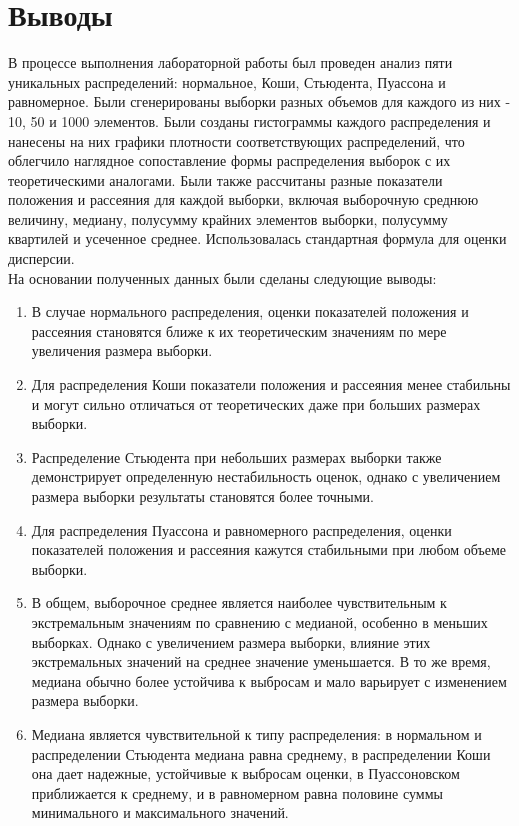 \documentclass[12pt,a4paper]{article}
\begin{document}
	\newpage

	\section{Выводы}

	В процессе выполнения лабораторной работы был проведен анализ пяти уникальных распределений: нормальное, Коши, Стьюдента, Пуассона и равномерное.
	Были сгенерированы выборки разных объемов для каждого из них - 10, 50 и 1000 элементов.
	Были созданы гистограммы каждого распределения и нанесены на них графики плотности соответствующих распределений, что облегчило наглядное сопоставление формы распределения выборок с их теоретическими аналогами.
	Были также рассчитаны разные показатели положения и рассеяния для каждой выборки, включая выборочную среднюю величину, медиану, полусумму крайних элементов выборки, полусумму квартилей и усеченное среднее.
	Использовалась стандартная формула для оценки дисперсии. \\

	На основании полученных данных были сделаны следующие выводы:

	\begin{enumerate}
		\item В случае нормального распределения, оценки показателей положения и рассеяния становятся ближе к их теоретическим значениям по мере увеличения размера выборки.
		\item Для распределения Коши показатели положения и рассеяния менее стабильны и могут сильно отличаться от теоретических даже при больших размерах выборки.
		\item Распределение Стьюдента при небольших размерах выборки также демонстрирует определенную нестабильность оценок, однако с увеличением размера выборки результаты становятся более точными.
		\item Для распределения Пуассона и равномерного распределения, оценки показателей положения и рассеяния кажутся стабильными при любом объеме выборки.
		\item В общем, выборочное среднее является наиболее чувствительным к экстремальным значениям по сравнению с медианой, особенно в меньших выборках. Однако с увеличением размера выборки, влияние этих экстремальных значений на среднее значение уменьшается. В то же время, медиана обычно более устойчива к выбросам и мало варьирует с изменением размера выборки.
		\item Медиана является чувствительной к типу распределения: в нормальном и распределении Стьюдента медиана равна среднему, в распределении Коши она дает надежные, устойчивые к выбросам оценки, в Пуассоновском приближается к среднему, и в равномерном равна половине суммы минимального и максимального значений.
	\end{enumerate}
\end{document}
